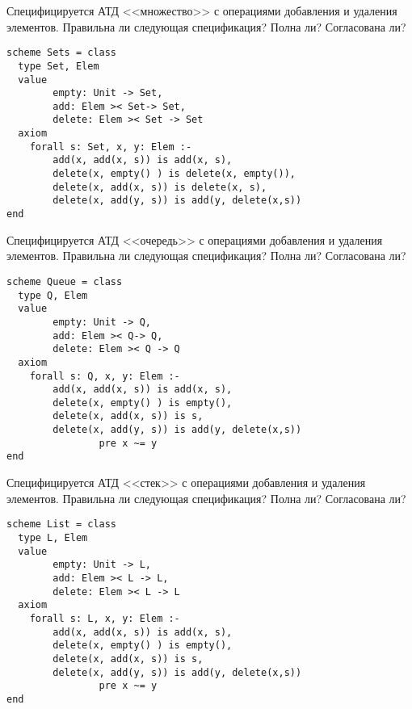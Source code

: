 \z Специфицируется АТД <<множество>> с операциями добавления и удаления элементов. Правильна ли следующая спецификация? Полна ли? Согласована ли?
\begin{lstlisting}
scheme Sets = class
  type Set, Elem
  value
        empty: Unit -> Set,
        add: Elem >< Set-> Set,
        delete: Elem >< Set -> Set
  axiom
    forall s: Set, x, y: Elem :-
        add(x, add(x, s)) is add(x, s),
        delete(x, empty() ) is delete(x, empty()),
        delete(x, add(x, s)) is delete(x, s),
        delete(x, add(y, s)) is add(y, delete(x,s))
end
\end{lstlisting}

\z Специфицируется АТД <<очередь>> с операциями добавления и удаления элементов. Правильна ли следующая спецификация? Полна ли? Согласована ли?
\begin{lstlisting}
scheme Queue = class
  type Q, Elem
  value
        empty: Unit -> Q,
        add: Elem >< Q-> Q,
        delete: Elem >< Q -> Q
  axiom
    forall s: Q, x, y: Elem :-
        add(x, add(x, s)) is add(x, s),
        delete(x, empty() ) is empty(),
        delete(x, add(x, s)) is s,
        delete(x, add(y, s)) is add(y, delete(x,s))
                pre x ~= y
end
\end{lstlisting}

\z Специфицируется АТД <<стек>> с операциями добавления и удаления элементов. Правильна ли следующая спецификация? Полна ли? Согласована ли?
\begin{lstlisting}
scheme List = class
  type L, Elem
  value
        empty: Unit -> L,
        add: Elem >< L -> L,
        delete: Elem >< L -> L
  axiom
    forall s: L, x, y: Elem :-
        add(x, add(x, s)) is add(x, s),
        delete(x, empty() ) is empty(),
        delete(x, add(x, s)) is s,
        delete(x, add(y, s)) is add(y, delete(x,s))
                pre x ~= y
end
\end{lstlisting}
